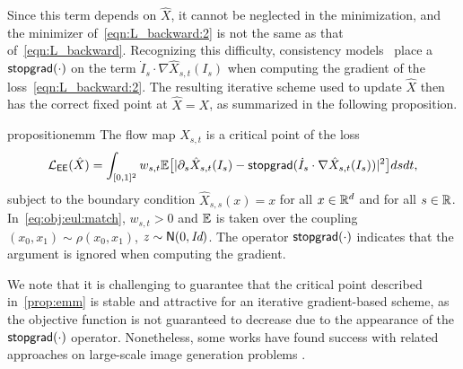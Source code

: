 %
Since this term depends on $\hat X$, it cannot be neglected in the minimization, and the minimizer of~\eqref{eqn:L_backward:2} is not the same as that of~\eqref{eqn:L_backward}.
%
Recognizing this difficulty, consistency models~\citep{song_consistency_2023, song_improved_2023, kim_consistency_2024} place a $\mathsf{stopgrad}(\cdot)$ on the term  $\dot I_s  \cdot \nabla \hat{X}_{s, t}(I_s)$ when computing the gradient of the loss~\eqref{eqn:L_backward:2}.
%
The resulting iterative scheme used to update $\hat X$ then has the correct fixed point at $\hat X = X$, as summarized in the following proposition.
%
\begin{restatable}{proposition}{emm}
	\label{prop:emm}
	The flow map $X_{s, t}$ is a critical point of the loss
	\begin{align}
		\label{eq:obj:eul:match}
		\mathcal{L}_{\mathsf{EE}}(\hat{X}) = \int_{[0,1]^2} w_{s,t} \mathbb{E} \big [| \partial_s \hat X_{s,t} (I_s) - \mathsf{stopgrad}(\dot{I}_s \cdot \nabla \hat X_{s,t} (I_s))|^2\big]  ds dt,
	\end{align}
	subject to the boundary condition $\hat{X}_{s, s}(x) = x$ for all $x \in \mathbb{R}^d$ and for all $s \in \mathbb{R}$.
	In~\eqref{eq:obj:eul:match}, $w_{s,t} > 0$ and $\mathbb{E}$ is taken over the coupling $(x_0, x_1) \sim \rho(x_0, x_1)$, $z \sim \mathsf N(0, \text{\it Id})$.
	The operator $\mathsf{stopgrad}(\cdot)$ indicates that the argument is ignored when computing the gradient.
\end{restatable}
%
We note that it is challenging to guarantee that the critical point described in~\cref{prop:emm} is stable and attractive for an iterative gradient-based scheme, as the objective function is not guaranteed to decrease due to the appearance of the $\mathsf{stopgrad}(\cdot)$ operator.
%
Nonetheless, some works have found success with related approaches on large-scale image generation problems \citep{song_consistency_2023}.

\begin{algorithm}[t]
	\caption{Progressive flow map matching (PFMM)}
	\label{alg:pfmm}
	\SetAlgoLined
\end{algorithm}

